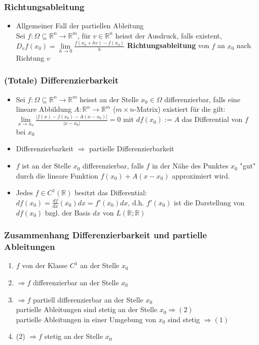 \documentclass[a3paper, 11pt, landscape]{scrartcl}
\newcommand{\Rn}{\mathbb{R}^n}
\newcommand{\fOmegaRnRm}{f:\Omega \subseteq\Rn\to\mathbb{R}^m}
\begin{document}
\begin{multicols*}{3}
    \subsubsection{Richtungsableitung}
    \begin{itemize}
        \item Allgemeiner Fall der partiellen Ableitung\\
        Sei $\fOmegaRnRm$, für $v\in\Rn$ heisst der Ausdruck, falls existent,\\
        $D_v f(x_0)=\lim\limits_{h\to 0} \frac{f(x_0 + hv)-f(x_0)}{h}$ \textbf{Richtungsableitung} von $f $ an $x_0$ nach Richtung $v$
    \end{itemize}
    
    \subsubsection{(Totale) Differenzierbarkeit}
    \begin{itemize}
        \item Sei $\fOmegaRnRm$ heisst an der Stelle $x_0\in\Omega$ differenzierbar, falls eine lineare Abbildung $A:\Rn\to\mathbb{R}^m$ ($m\times n$-Matrix) existiert für die gilt:\\
        $\lim\limits_{x\to x_0} \frac{|f(x)-f(x_0) - A(x-x_0)|}{|x-x_0|}=0$ mit $df(x_0):=A$ das Differential von $f$ bei $x_0$
        \item Differenzierbarkeit $\Rightarrow$ partielle Differenzierbarkeit
        \item $f$ ist an der Stelle $x_0$ differenzierbar, falls $f$ in der Nähe des Punktes $x_0$ "gut" durch die lineare Funktion $f(x_0)+A(x-x_0)$ approximiert wird.
        \item Jedes $f\in C^1(\mathbb{R})$ besitzt das Differential: $df(x_0)=\frac{df}{dx}(x_0)dx=f'(x_0)dx$, d.h. $f'(x_0)$ ist die Darstellung von $df(x_0)$ bzgl. der Basis $dx$ von $L(\mathbb{R};\mathbb{R})$
    \end{itemize}
    
    \subsubsection{Zusammenhang Differenzierbarkeit und partielle Ableitungen}
    \begin{enumerate}
        \item $f$ von der Klasse $C^1$ an der Stelle $x_0$
        \item $\Rightarrow f$ differenzierbar an der Stelle $x_0$
        \item $\Rightarrow f$ partiell differenzierbar an der Stelle $x_0$\\
        partielle Ableitungen sind stetig an der Stelle $x_0 \Rightarrow (2)$ \\
        partielle Ableitungen in einer Umgebung von $x_0$ sind stetig $\Rightarrow (1)$
        \item (2) $\Rightarrow f$ stetig an der Stelle $x_0$
    \end{enumerate}
    

\end{multicols*}
\end{document}
